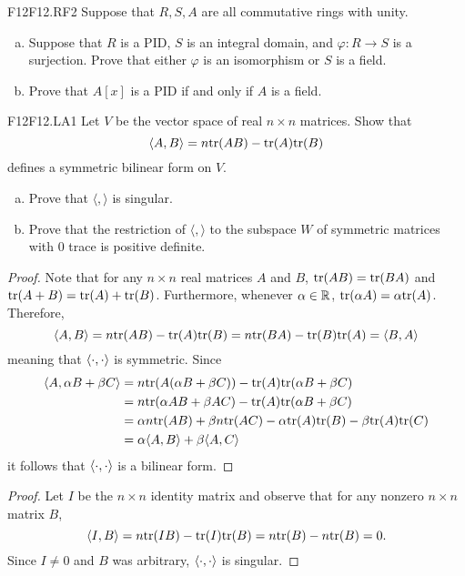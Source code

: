 \documentclass[../AlgebraQualSolutions.tex]{subfiles}
\begin{document}
\begin{prob}{F12}{F12.RF2}
Suppose that $R,S,A$ are all commutative rings with unity.
\begin{enumerate}[(a)]
\item Suppose that $R$ is a PID, $S$ is an integral domain, and $\varphi:R \to S$ is a surjection. Prove that either $\varphi$ is an isomorphism or $S$ is a field.
\item Prove that $A[x]$ is a PID if and only if $A$ is a field.
\end{enumerate}
\end{prob}

\begin{prob}{F12}{F12.LA1}
Let $V$ be the vector space of real $n \times n$ matrices. Show that 	
	\[\langle A, B \rangle = n \mathrm{tr}(AB) - \mathrm{tr}(A)\mathrm{tr}(B) \]
defines a symmetric bilinear form on $V$.
\begin{enumerate}[(a)]
\item Prove that $\langle,\rangle$ is singular.
\item Prove that the restriction of $\langle,\rangle$ to the subspace $W$ of symmetric matrices with 0 trace is positive definite.
\end{enumerate}
\end{prob}

\begin{proof}
	Note that for any $n \times n$ real matrices $A$ and $B$, $\mathrm{tr}(AB) = \mathrm{tr}(BA)$ and $\mathrm{tr}(A+B) = \mathrm{tr}(A) + \mathrm{tr}(B)$. Furthermore, whenever $\alpha \in \mathbb{R}$, $\mathrm{tr}(\alpha A) = \alpha \mathrm{tr}(A)$. Therefore,
		\[\langle A, B\rangle = n \mathrm{tr}(AB) - \mathrm{tr}(A)\mathrm{tr}(B) = n \mathrm{tr}(BA) - \mathrm{tr}(B)\mathrm{tr}(A) = \langle B, A\rangle\]
	meaning that $\langle \cdot, \cdot\rangle$ is symmetric. Since
		\begin{align*}
			\langle A, \alpha B + \beta C\rangle &= n\mathrm{tr}(A(\alpha B + \beta C)) - \mathrm{tr}(A) \mathrm{tr}(\alpha B + \beta C)\\
			&= n\mathrm{tr}(\alpha AB + \beta AC) - \mathrm{tr}(A) \mathrm{tr}(\alpha B + \beta C)\\
			&= \alpha n \mathrm{tr}(AB) + \beta n \mathrm{tr}(AC) - \alpha \mathrm{tr}(A)\mathrm{tr}(B) - \beta \mathrm{tr}(A)\mathrm{tr}(C)\\
			&= \alpha \langle A, B\rangle + \beta\langle A, C\rangle
		\end{align*}
	it follows that $\langle \cdot, \cdot\rangle$ is a bilinear form.
\end{proof}

\begin{proof}
	Let $I$ be the $n \times n$ identity matrix and observe that for any nonzero $n \times n$ matrix $B$,
		\[\langle I, B\rangle = n\mathrm{tr}(IB) - \mathrm{tr}(I)\mathrm{tr}(B) = n\mathrm{tr}(B) - n \mathrm{tr}(B) = 0.\]
	Since $I \neq 0$ and $B$ was arbitrary, $\langle \cdot, \cdot\rangle$ is singular.
\end{proof}
\end{document}
